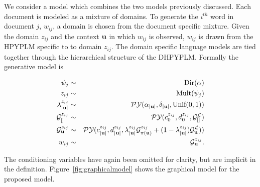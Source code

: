 We consider a model which combines the two models previously discussed.  Each document is modeled as a mixture of domains.  To generate the $i^{th}$ word in document $j$, $w_{ij}$, a domain is chosen from the document specific mixture.  Given the domain $z_{ij}$ and the context $\bu$ in which $w_{ij}$ is observed, $w_{ij}$ is drawn from the HPYPLM specific to to domain $z_{ij}$.  The domain specific language models are tied together through the hierarchical structure of the DHPYPLM.  Formally the generative model is

\begin{eqnarray}
\psi_j  &\sim& \textrm{Dir}(\alpha) \nonumber\\
z_{ij}  &\sim& \textrm{Mult}(\psi_j) \nonumber\\
\lambda^{z_{ij}}_{|\bu|} &\sim& \PY(\alpha_{|\bu|}, \delta_{|\bu|}, \textrm{Unif}(0,1)) \nonumber \\
\G^{z_{ij}}_{[]} &\sim& \PY(c^{ z_{ij}}_0, d^{ z_{ij}}_0,\G^\LA_{[]}) \nonumber \\
\G^{ z_{ij}}_\bu &\sim& \PY(c^{ z_{ij}}_{|\bu|}, d^{ z_{ij}}_{|\bu|}, \lambda^{ z_{ij}}_{|\bu|}\G^{ z_{ij}}_{\pi(\bu)} + (1-\lambda^{ z_{ij}}_{|\bu|})\G^\LA_\bu)) \nonumber \\ 
w_{ij}  &\sim& \G^{z_{ij}}_\bu \nonumber.
\end{eqnarray}

The conditioning variables have again been omitted for clarity, but are implicit in the definition.  Figure~\ref{fig:graphicalmodel} shows the graphical model for the proposed model.

